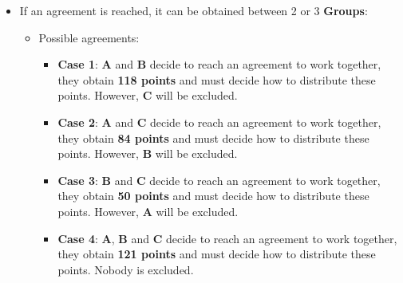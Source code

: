 \documentclass[
  ignorenonframetext,
]{beamer}
\begin{document}
\begin{frame}{}
\label{section-6}
\begin{itemize}
\item
  If an agreement is reached, it can be obtained between 2 or 3
  \textbf{Groups}:

  \begin{itemize}
  \item
    Possible agreements:

    \begin{itemize}
    \item
      \textbf{Case 1}: \textbf{A} and \textbf{B} decide to reach an
      agreement to work together, they obtain \textbf{118 points} and
      must decide how to distribute these points. However, \textbf{C}
      will be excluded.
    \item
      \textbf{Case 2}: \textbf{A} and \textbf{C} decide to reach an
      agreement to work together, they obtain \textbf{84 points} and
      must decide how to distribute these points. However, \textbf{B}
      will be excluded.
    \item
      \textbf{Case 3}: \textbf{B} and \textbf{C} decide to reach an
      agreement to work together, they obtain \textbf{50 points} and
      must decide how to distribute these points. However, \textbf{A}
      will be excluded.
    \item
      \textbf{Case 4}: \textbf{A}, \textbf{B} and \textbf{C} decide to
      reach an agreement to work together, they obtain \textbf{121
      points} and must decide how to distribute these points. Nobody is
      excluded.
    \end{itemize}
  \end{itemize}
\end{itemize}
\end{frame}
\end{document}
